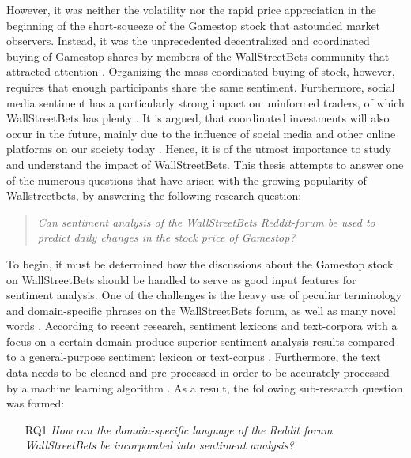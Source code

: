 \documentclass[11pt, a4paper]{article}
\begin{document}
However, it was neither the volatility nor the rapid price appreciation in the beginning of the short-squeeze of the Gamestop stock that astounded market observers. 
Instead, it was the unprecedented decentralized and coordinated buying of Gamestop shares by members of the WallStreetBets 
community that attracted attention \citep{anand2021WallstreetbetsAgainstWallstreet}.
Organizing the mass-coordinated buying of stock, however, requires that enough participants share the same sentiment. Furthermore, 
social media sentiment has a particularly strong impact on uninformed traders, of which WallStreetBets has plenty \citep{danbolt2015InvestorSentiment}. It is argued, that coordinated investments will also
occur in the future, mainly due to the influence of social media and other online platforms on our society today \citep{semenova2021reddits}. Hence, it is of the utmost importance
to study and understand the impact of WallStreetBets. This thesis attempts to answer one of the numerous questions that have arisen with the 
growing popularity of Wallstreetbets, by answering the following research question:

\begin{quote}
\emph{Can sentiment analysis of the WallStreetBets Reddit-forum be used to predict daily changes in the stock price of Gamestop?}
\end{quote}

To begin, it must be determined how the discussions about the Gamestop stock on WallStreetBets should be handled to serve as good input features for sentiment analysis. 
One of the challenges is the heavy use of peculiar terminology and domain-specific phrases on the WallStreetBets forum, as well as many novel words \citep{anand2021WallstreetbetsAgainstWallstreet}. 
According to recent research, sentiment lexicons and text-corpora with a focus on a certain domain produce superior sentiment analysis results compared to a 
general-purpose sentiment lexicon or text-corpus \citep{park2015EfficientExtraction}. Furthermore, the text data needs to be cleaned and pre-processed in order to be accurately 
processed by a machine learning algorithm \citep{jemai2021SentimentAnalysis}. As a result, the following sub-research question was formed:

\begin{itemize}
    \item[RQ1] \emph{How can the domain-specific language of the Reddit forum WallStreetBets be incorporated into sentiment analysis?}
\end{itemize}
\end{document}
